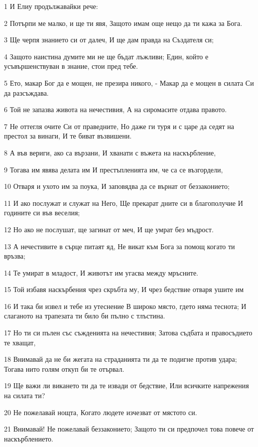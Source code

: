 \par 1 И Елиу продължавайки рече:
\par 2 Потърпи ме малко, и ще ти явя, Защото имам още нещо да ти кажа за Бога.
\par 3 Ще черпя знанието си от далеч, И ще дам правда на Създателя си;
\par 4 Защото наистина думите ми не ще бъдат лъжливи; Един, който е усъвършенствуван в знание, стои пред тебе.
\par 5 Ето, макар Бог да е мощен, не презира никого, - Макар да е мощен в силата Си да разсъждава.
\par 6 Той не запазва живота на нечестивия, А на сиромасите отдава правото.
\par 7 Не оттегля очите Си от праведните, Но даже ги туря и с царе да седят на престол за винаги, И те биват възвишени.
\par 8 А във вериги, ако са вързани, И хванати с въжета на наскърбление,
\par 9 Тогава им явява делата им И престъпленията им, че са се възгордели,
\par 10 Отваря и ухото им за поука, И заповядва да се върнат от беззаконието;
\par 11 И ако послужат и служат на Него, Ще прекарат дните си в благополучие И годините си във веселия;
\par 12 Но ако не послушат, ще загинат от меч, И ще умрат без мъдрост.
\par 13 А нечестивите в сърце питаят яд, Не викат към Бога за помощ когато ти връзва;
\par 14 Те умират в младост, И животът им угасва между мръсните.
\par 15 Той избавя наскърбения чрез скръбта му, И чрез бедствие отваря ушите им
\par 16 И така би извел и тебе из утеснение В широко място, гдето няма теснота; И слаганото на трапезата ти било би пълно с тлъстина.
\par 17 Но ти си пълен със съжденията на нечестивия; Затова съдбата и правосъдието те хващат,
\par 18 Внимавай да не би жегата на страданията ти да те подигне против удара; Тогава нито голям откуп би те отървал.
\par 19 Ще важи ли викането ти да те извади от бедствие, Или всичките напрежения на силата ти?
\par 20 Не пожелавай нощта, Когато людете изчезват от мястото си.
\par 21 Внимавай! Не пожелавай беззаконието; Защото ти си предпочел това повече от наскърблението.

